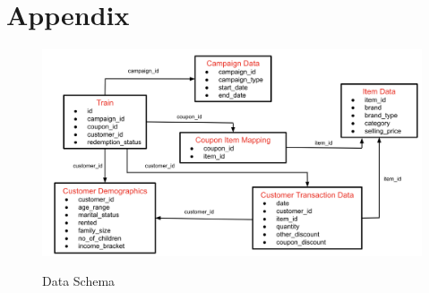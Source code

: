 \section{Appendix}
\label{sec:Appendix}
\begin{figure}[hbt!]
    \centering 
    \caption{Data Schema} 
    \includegraphics[width=5.5in]{img/data.png} 
    \label{fig:data} 
  \end{figure}
